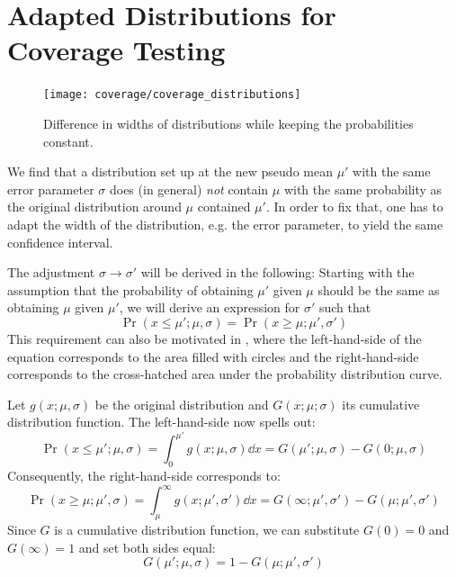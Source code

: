 \newpage
\section{Adapted Distributions for Coverage Testing}
\label{app:coverage_uncertainty}

\begin{figure}
    \centering
    \texttt{[image: coverage/coverage\_distributions]}
    \caption{Difference in widths of distributions while keeping the probabilities constant.}
    \label{fig:coverage_distributions}
\end{figure}


We find that a distribution set up at the new pseudo mean $\mu'$ with the same error parameter $\sigma$ does (in general) \emph{not} contain $\mu$ with the same probability as the original distribution around $\mu$ contained $\mu'$.
In order to fix that, one has to adapt the width of the distribution, e.g. the error parameter, to yield the same confidence interval.

The adjustment $\sigma \rightarrow \sigma'$ will be derived in the following:
Starting with the assumption that the probability of obtaining $\mu'$ given $\mu$ should be the same as obtaining $\mu$ given $\mu'$, we will derive an expression for $\sigma'$ such that
\begin{equation}
    \Pr(x \leq \mu'; \mu, \sigma) = \Pr(x \geq \mu; \mu', \sigma')
\end{equation}
This requirement can also be motivated in , where the left-hand-side of the equation corresponds to the area filled with circles and the right-hand-side corresponds to the cross-hatched area under the probability distribution curve.

Let $g(x; \mu, \sigma)$ be the original distribution and $G(x; \mu; \sigma)$ its cumulative distribution function. The left-hand-side now spells out:
\begin{equation}
    \Pr(x \leq \mu'; \mu, \sigma) = \int_0^{\mu'} g(x; \mu, \sigma) \dd{x} = G(\mu'; \mu, \sigma) - G(0; \mu, \sigma)
\end{equation}
Consequently, the right-hand-side corresponds to:
\begin{equation}
    \Pr(x \geq \mu; \mu', \sigma) = \int_\mu^\infty g(x; \mu', \sigma') \dd{x} = G(\infty; \mu', \sigma') - G(\mu; \mu', \sigma')
\end{equation}
Since $G$ is a cumulative distribution function, we can substitute $G(0) = 0$ and $G(\infty) = 1$ and set both sides equal:
\begin{equation}
    G(\mu'; \mu, \sigma) = 1 - G(\mu; \mu', \sigma')
\end{equation}

